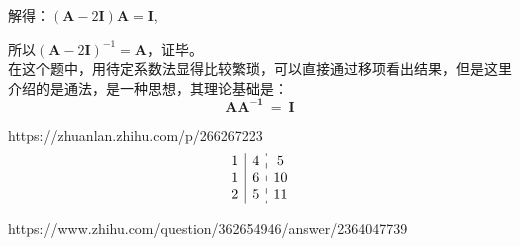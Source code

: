 \documentclass{ctexart}
\begin{document}
            解得：$(\mathbf{A}-2\mathbf{I})\mathbf{A}=\mathbf{I}$,
            
            所以$(\mathbf{A}-2\mathbf{I})^{-1} = \mathbf{A}$，证毕。\\


            在这个题中，用待定系数法显得比较繁琐，可以直接通过移项看出结果，但是这里介绍的是通法，是一种思想，其理论基础是：
            $$ \mathbf{AA^{-1}}~=~\mathbf{I}$$
            \vrule width11cm height1.5pt depth-1pt %
            
            https://zhuanlan.zhihu.com/p/266267223
            $$
            \begin{array}{c|c:c}
                1 & 4 & 5\\
                1 & 6 & 10\\
                2 & 5 & 11\\
            \end{array}
            $$


            https://www.zhihu.com/question/362654946/answer/2364047739
            
\end{document}
